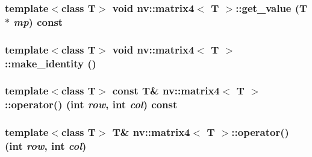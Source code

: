 \hypertarget{classnv_1_1matrix4_7071f369675281ba258515b1169a246e}{
\subsubsection[{get\_\-value}]{\setlength{\rightskip}{0pt plus 5cm}template$<$class T$>$ void {\bf nv::matrix4}$<$ T $>$::get\_\-value (T $\ast$ {\em mp}) const}}
\label{classnv_1_1matrix4_7071f369675281ba258515b1169a246e}


\hypertarget{classnv_1_1matrix4_76a93589ae31c19e90d9199a8510504c}{
\subsubsection[{make\_\-identity}]{\setlength{\rightskip}{0pt plus 5cm}template$<$class T$>$ void {\bf nv::matrix4}$<$ T $>$::make\_\-identity ()}}
\label{classnv_1_1matrix4_76a93589ae31c19e90d9199a8510504c}


\hypertarget{classnv_1_1matrix4_eb010106f27df3248d2ad4086c4bb4f5}{
\subsubsection[{operator()}]{\setlength{\rightskip}{0pt plus 5cm}template$<$class T$>$ const T\& {\bf nv::matrix4}$<$ T $>$::operator() (int {\em row}, \/  int {\em col}) const}}
\label{classnv_1_1matrix4_eb010106f27df3248d2ad4086c4bb4f5}


\hypertarget{classnv_1_1matrix4_bb80585790ba8ec85d80539f0ebcd488}{
\subsubsection[{operator()}]{\setlength{\rightskip}{0pt plus 5cm}template$<$class T$>$ T\& {\bf nv::matrix4}$<$ T $>$::operator() (int {\em row}, \/  int {\em col})}}
\label{classnv_1_1matrix4_bb80585790ba8ec85d80539f0ebcd488}


